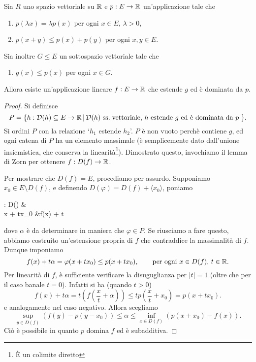 \begin{theorem}
\label{th:hahn_banach}
	Sia $R$ uno spazio vettoriale su $\mathbb{R}$ e $p : E \to \mathbb{R}$ un'applicazione tale che
	\begin{enumerate}
		\item $p(\lambda x) = \lambda p(x)$ per ogni $x \in E$, $\lambda > 0$,
		\item $p(x+y) \leq p(x) + p(y)$ per ogni $x,y \in E$.
	\end{enumerate}
	Sia inoltre $G \leq E$ un sottospazio vettoriale tale che
	\begin{enumerate}[resume]
		\item $g(x) \leq p(x)$ per ogni $x \in G$.
	\end{enumerate}
	Allora esiste un'applicazione lineare $f : E \to \mathbb{R}$ che estende $g$ ed è dominata da $p$.
\end{theorem}
\begin{proof}
	Si definisce
	\begin{equation*}
		P = \{ h : \mathcal D(h) \subseteq E \to \mathbb{R} \,|\, \text{$\mathcal D(h)$ ss.\! vettoriale, $h$ estende $g$ ed è dominata da $p$ } \}.
	\end{equation*}
	Si ordini $P$ con la relazione `$h_1$ estende $h_2$'. $P$ è non vuoto perchè contiene $g$, ed ogni catena di $P$ ha un elemento massimale (è semplicemente dato dall'unione insiemistica, che conserva la linearità\footnote{È un colimite diretto}). Dimostrato questo, invochiamo il lemma di Zorn per ottenere $f : D(f) \to \mathbb{R}$.

	Per mostrare che $D(f) = E$, procediamo per assurdo.
	Supponiamo $x_0 \in E \setminus D(f)$, e definendo $D(\varphi) = D(f) + \langle x_0 \rangle$, poniamo
	\begin{eqalign*}
		\varphi : D(\varphi) &\longto \R\\
				x + tx_0 &\longmapsto f(x) + t \alpha
	\end{eqalign*}
	dove $\alpha$ è da determinare in maniera che $\varphi \in P$. Se riusciamo a fare questo, abbiamo costruito un'estensione propria di $f$ che contraddice la massimalità di $f$.
	Dunque imponiamo
	\begin{equation*}
		f(x) + t\alpha = \varphi(x+tx_0) \leq p(x+tx_0), \qquad \text{per ogni $x \in D(f)$, $t \in \mathbb{R}$}.
	\end{equation*}
	Per linearità di $f$, è sufficiente verificare la disuguglianza per $|t|=1$ (oltre che per il caso banale $t=0$). Infatti si ha (quando $t > 0$)
	\begin{equation*}
		f(x) + t\alpha = t\left(f\left(\frac{x}{t} + \alpha\right)\right) \leq t p\left(\frac{x}{t} + x_0\right) = p(x + tx_0).
	\end{equation*}
	e analogamente nel caso negativo. Allora scegliamo
	\begin{equation*}
		\sup_{y \in D(f)} (f(y) - p(y-x_0)) \leq \alpha \leq \inf_{x \in D(f)} (p(x+x_0) - f(x)).
	\end{equation*}
	Ciò è possibile in quanto $p$ domina $f$ ed è subadditiva.
\end{proof}

